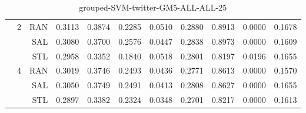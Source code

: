 \begin{center}
\begin{table}[htbp]
\begin{center}
\begin{tabular}{ | r | r | r | r | r | r | r | r | r | r | r |}
 & \multirow{3}{*}{2} & RAN & 0.3113 & 0.3874 & 0.2285 & 0.0510 & 0.2880 & 0.8913 & 0.0000 & 0.1678\\ \cline{3-11}
 &   & SAL & 0.3080 & 0.3700 & 0.2576 & 0.0447 & 0.2838 & 0.8973 & 0.0000 & 0.1609\\ \cline{3-11}
 &   & STL & 0.2958 & 0.3352 & 0.1840 & 0.0518 & 0.2801 & 0.8197 & 0.0196 & 0.1655\\ \cline{2-11}
 & \multirow{3}{*}{4} & RAN & 0.3019 & 0.3746 & 0.2493 & 0.0436 & 0.2771 & 0.8613 & 0.0000 & 0.1570\\ \cline{3-11}
 &   & SAL & 0.3050 & 0.3749 & 0.2491 & 0.0413 & 0.2808 & 0.8627 & 0.0000 & 0.1655\\ \cline{3-11}
 &   & STL & 0.2897 & 0.3382 & 0.2324 & 0.0348 & 0.2701 & 0.8217 & 0.0000 & 0.1613\\ \cline{2-11}
\hline
\end{tabular}
\caption{grouped-SVM-twitter-GM5-ALL-ALL-25}
\end{center}
 \end{table}
\end{center}

